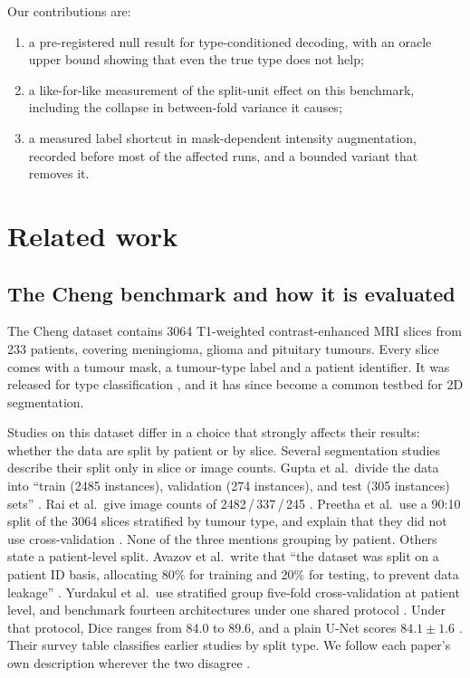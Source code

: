 \documentclass[11pt,a4paper]{article}
\begin{document}
Our contributions are:
\begin{enumerate}
\item a pre-registered null result for type-conditioned decoding, with an oracle
upper bound showing that even the true type does not help;
\item a like-for-like measurement of the split-unit effect on this benchmark,
including the collapse in between-fold variance it causes;
\item a measured label shortcut in mask-dependent intensity augmentation, recorded
before most of the affected runs, and a bounded variant that removes it.
\end{enumerate}

\section{Related work}
\label{sec:related}

\subsection{The Cheng benchmark and how it is evaluated}

The Cheng dataset \citep{chengdata,cheng2015} contains 3064 T1-weighted
contrast-enhanced MRI slices from 233 patients, covering meningioma, glioma and
pituitary tumours. Every slice comes with a tumour mask, a tumour-type label and a
patient identifier. It was released for type classification \citep{cheng2015},
and it has since become a common testbed for 2D segmentation.

Studies on this dataset differ in a choice that strongly affects their results:
whether the data are split by patient or by slice. Several segmentation studies
describe their split only in slice or image counts. Gupta et al.\ divide the data
into ``train (2485 instances), validation (274 instances), and test (305
instances) sets'' \citep{gupta2023}. Rai et al.\ give image counts of
2482\,/\,337\,/\,245 \citep{rai2024}. Preetha et al.\ use a 90:10 split of the
3064 slices stratified by tumour type, and explain that they did not use
cross-validation \citep{preetha2025}. None of the three mentions grouping by
patient. Others state a patient-level split. Avazov et al.\ write that ``the
dataset was split on a patient ID basis, allocating 80\% for training and 20\% for
testing, to prevent data leakage'' \citep{avazov2024}. Yurdakul et al.\ use
stratified group five-fold cross-validation at patient level, and benchmark
fourteen architectures under one shared protocol \citep{yurdakul2026}. Under that
protocol, Dice ranges from 84.0 to 89.6, and a plain U-Net scores
$84.1\pm1.6$ \citep[Table~2]{yurdakul2026}. Their survey table classifies earlier
studies by split type. We follow each paper's own description wherever the two
disagree \citep[Table~1]{yurdakul2026}.
\end{document}
